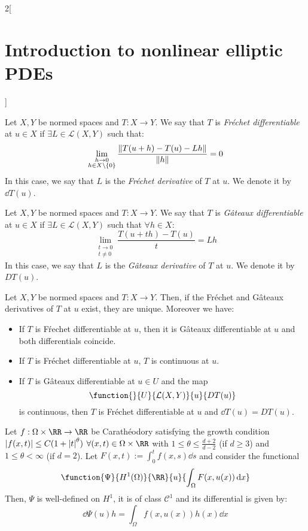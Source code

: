 \documentclass[../../../main_math.tex]{subfiles}
\begin{document}
\begin{multicols}{2}[\section{Introduction to nonlinear elliptic PDEs}]
\begin{definition}
    Let $X,Y$ be normed spaces and $T:X\to Y$. We say that $T$ is \emph{Fréchet differentiable} at $u\in X$ if $\exists L\in \mathcal{L}(X,Y)$ such that:
    $$
      \lim_{\substack{h\to 0\\h\in X\setminus\{0\}}}\frac{\norm{T(u+h)-T(u)-Lh}}{\norm{h}}=0
    $$
    In this case, we say that $L$ is the \emph{Fréchet derivative} of $T$ at $u$. We denote it by $\dd{T(u)}$.
  \end{definition}
  \begin{definition}
    Let $X,Y$ be normed spaces and $T:X\to Y$. We say that $T$ is \emph{Gâteaux differentiable} at $u\in X$ if $\exists L\in \mathcal{L}(X,Y)$ such that $\forall h\in X$:
    $$
      \lim_{\substack{t\to 0\\t\ne 0}}\frac{T(u+th)-T(u)}{t}=Lh
    $$
    In this case, we say that $L$ is the \emph{Gâteaux derivative} of $T$ at $u$. We denote it by $D{T}(u)$.
  \end{definition}
  \begin{lemma}
    Let $X,Y$ be normed spaces and $T:X\to Y$. Then, if the Fréchet and Gâteaux derivatives of $T$ at $u$ exist, they are unique. Moreover we have:
    \begin{itemize}
      \item If $T$ is Fŕechet differentiable at $u$, then it is Gâteaux differentiable at $u$ and both differentials coincide.
      \item If $T$ is Fréchet differentiable at $u$, $T$ is continuous at $u$.
      \item If $T$ is Gâteaux differentiable at $u\in U$ and the map
            $$
              \function{}{U}{\mathcal{L}(X,Y)}{u}{DT(u)}
            $$
            is continuous, then $T$ is Fréchet differentiable at $u$ and $\dd{T(u)}=DT(u)$.
    \end{itemize}
  \end{lemma}
  \begin{proposition}\label{INEPDE:minimization_prop2}
    Let $f:\Omega\times \RR\to\RR$ be Carathéodory satisfying the growth condition $\abs{f(x,t)}\leq C(1+\abs{t}^\theta)$ $\forall (x,t)\in \Omega\times \RR$ with $1\leq \theta\leq \frac{d+2}{d-2}$ (if $d\geq 3$) and $1\leq \theta<\infty$ (if $d=2$). Let $F(x,t):=\int_0^tf(x,s)\dd{s}$ and consider the functional
    $$
      \function{\Psi}{H^1(\Omega)}{\RR}{u}{\displaystyle\int_\Omega F(x,u(x))\dd{x}}
    $$
    Then, $\Psi$ is well-defined on $H^1$, it is of class $\mathcal{C}^1$ and its differential is given by:
    $$
      \dd{\Psi(u)}h=\int_\Omega f(x,u(x))h(x)\dd{x}
$$
\end{proposition}
\end{multicols}
\end{document}
